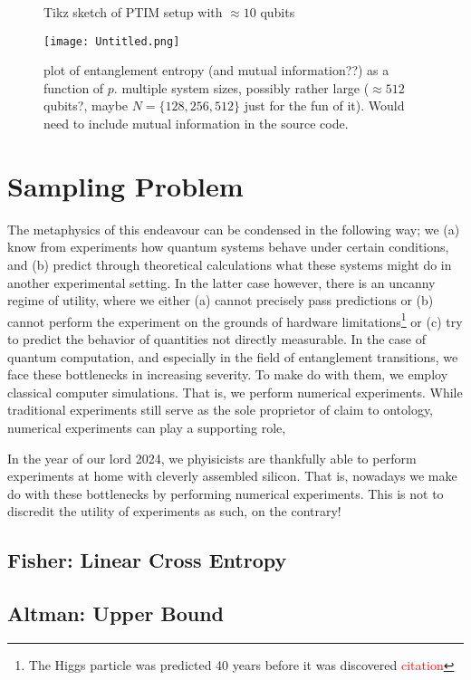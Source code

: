\begin{figure}[t]
  \centering
  
  \caption{Tikz sketch of PTIM setup with $\approx 10$ qubits}
  \label{fig:ptim-circuit}
\end{figure}

\begin{figure}[h]
  \centering
  \texttt{[image: Untitled.png]}
  \caption{plot of entanglement entropy (and mutual information??) as a
  function of $p$. multiple system sizes, possibly rather large ($\approx 512$
qubits?, maybe $N=\{128,256,512\}$ just for the fun of it). Would need to
include mutual information in the source code.}
  \label{fig:phase-transition}
\end{figure}

\section{Sampling Problem}\label{sec:sampling}
The metaphysics of this endeavour can
be condensed in the following way; we (a) know from experiments how quantum
systems behave under certain conditions, and (b) predict through theoretical
calculations what these systems might do in another experimental setting. In
the latter case however, there is an uncanny regime of utility, where we either
(a) cannot precisely pass predictions or (b) cannot perform the experiment on
the grounds of hardware limitations\footnote{The Higgs particle was predicted
40 years before it was discovered \textcolor{red}{citation}} or (c) try to
predict the behavior of quantities not directly measurable. In the case of
quantum computation, and especially in the field of entanglement transitions,
we face these bottlenecks in increasing severity. To make do with them, we
employ classical computer simulations. That is, we perform numerical
experiments. While traditional experiments still serve as the sole proprietor of claim to
ontology, numerical experiments can play a supporting role, 

In the year of our
lord 2024, we phyisicists are thankfully able to perform experiments at home
with cleverly assembled silicon.  That is, nowadays we make do with these
bottlenecks by performing numerical experiments. This is not to discredit the
utility of experiments as such, on the contrary! 

\subsection{Fisher: Linear Cross Entropy}
\cite{liCrossEntropyBenchmark2023}

\subsection{Altman: Upper Bound}
\cite{garrattProbingPostmeasurementEntanglement2024}
